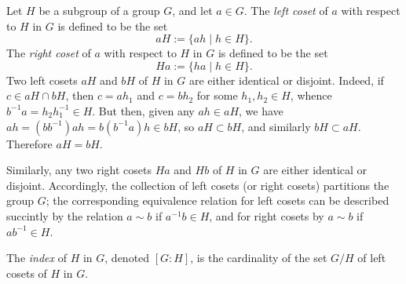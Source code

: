 \documentclass{article}
\begin{document}
Let $H$ be a subgroup of a group $G$, and let $a \in G$. The {\em left coset} of $a$ with respect to $H$ in $G$ is defined to be the set
$$
aH := \{ ah \mid h \in H \}.
$$
The {\em right coset} of $a$ with respect to $H$ in $G$ is defined to be the set
$$
Ha := \{ ha \mid h \in H \}.
$$
Two left cosets $aH$ and $bH$ of $H$ in $G$ are either identical or disjoint. Indeed, if $c \in aH \cap bH$, then $c = ah_1$ and $c = bh_2$ for some $h_1,h_2 \in H$, whence $b^{-1} a = h_2 h_1^{-1} \in H$. But then, given any $ah \in aH$, we have $ah = (bb^{-1})ah = b(b^{-1}a) h \in bH$, so $aH \subset bH$, and similarly $bH \subset aH$. Therefore $aH = bH$.

Similarly, any two right cosets $Ha$ and $Hb$ of $H$ in $G$ are either identical or disjoint. Accordingly, the collection of left cosets (or right cosets) partitions the group $G$; the corresponding equivalence relation for left cosets can be described succintly by the relation $a \sim b$ if $a^{-1} b \in H$, and for right cosets by $a \sim b$ if $ab^{-1} \in H$.

The {\em index} of $H$ in $G$, denoted $[G:H]$, is the cardinality of the set $G/H$ of left cosets of $H$ in $G$.
\end{document}

